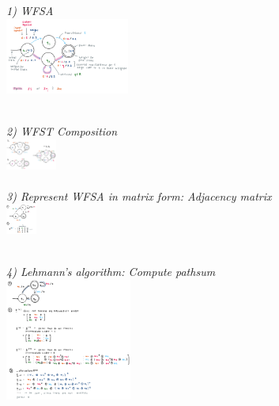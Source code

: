 \textit{1) WFSA}\\
\includegraphics[height=25mm]{inhalt/images/NLP/06_wfsa_1.png}
\\\\
\begin{multicols}{2}
\textit{2) WFST Composition}\\
\includegraphics[height=10mm]{inhalt/images/NLP/06_wfsa_2.png}
\\\\
\textit{3) Represent WFSA in matrix form: Adjacency matrix}\\
\includegraphics[height=10mm]{inhalt/images/NLP/06_wfsa_3.png}\\\\
\end{multicols}
\textit{4) Lehmann's algorithm: Compute pathsum}\\
\includegraphics[height=40mm]{inhalt/images/NLP/06_wfsa_4.png}